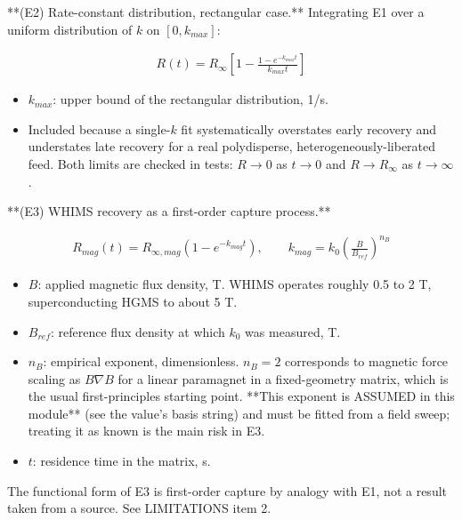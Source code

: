 \documentclass[10pt,a4paper,twoside]{report}
\begin{document}
**(E2) Rate-constant distribution, rectangular case.** Integrating E1 over a uniform distribution of $k$ on $[0, k_{max}]$:

\begin{equation*}
\begin{gathered}
R(t) = R_{\infty} \left[ 1 - \frac{1 - e^{-k_{max} t}}{k_{max} t} \right]
\end{gathered}
\end{equation*}

\begin{itemize}
\item $k_{max}$: upper bound of the rectangular distribution, 1/s.
\item Included because a single-$k$ fit systematically overstates early recovery and understates late recovery for a real polydisperse, heterogeneously-liberated feed. Both limits are checked in tests: $R \to 0$ as $t \to 0$ and $R \to R_{\infty}$ as $t \to \infty$.
\end{itemize}

**(E3) WHIMS recovery as a first-order capture process.**

\begin{equation*}
\begin{gathered}
R_{mag}(t) = R_{\infty,mag} \left( 1 - e^{-k_{mag} t} \right), \qquad k_{mag} = k_0 \left( \frac{B}{B_{ref}} \right)^{n_B}
\end{gathered}
\end{equation*}

\begin{itemize}
\item $B$: applied magnetic flux density, T. WHIMS operates roughly 0.5 to 2 T, superconducting HGMS to about 5 T.
\item $B_{ref}$: reference flux density at which $k_0$ was measured, T.
\item $n_B$: empirical exponent, dimensionless. $n_B = 2$ corresponds to magnetic force scaling as $B \nabla B$ for a linear paramagnet in a fixed-geometry matrix, which is the usual first-principles starting point. **This exponent is ASSUMED in this module** (see the value's basis string) and must be fitted from a field sweep; treating it as known is the main risk in E3.
\item $t$: residence time in the matrix, s.
\end{itemize}

The functional form of E3 is first-order capture by analogy with E1, not a result taken from a source. See LIMITATIONS item 2.
\end{document}
